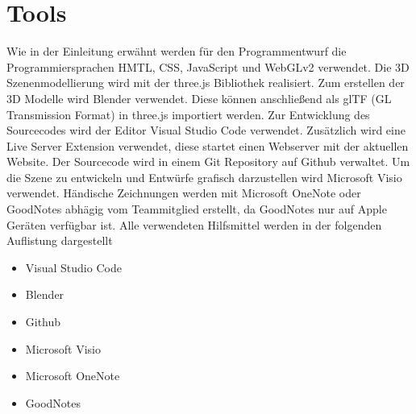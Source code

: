 \section{Tools}
Wie in der Einleitung erwähnt werden für den Programmentwurf die
Programmiersprachen HMTL, CSS, JavaScript und WebGLv2 verwendet.
Die 3D Szenenmodellierung wird mit der three.js Bibliothek realisiert.
Zum erstellen der 3D Modelle wird Blender verwendet. Diese können anschließend als
glTF (GL Transmission Format) in three.js importiert werden.
\newparagraph
Zur Entwicklung des Sourcecodes wird der Editor Visual Studio Code verwendet.
Zusätzlich wird eine Live Server Extension verwendet, diese startet einen Webserver mit der aktuellen Website.
Der Sourcecode wird in einem Git Repository auf Github verwaltet.
\newparagraph
Um die Szene zu entwickeln und Entwürfe grafisch darzustellen wird Microsoft Visio verwendet.
Händische Zeichnungen werden mit Microsoft OneNote oder GoodNotes abhägig vom Teammitglied erstellt,
da GoodNotes nur auf Apple Geräten verfügbar ist.
\newparagraph
Alle verwendeten Hilfsmittel werden in der folgenden Auflistung dargestellt
\begin{itemize}
\item Visual Studio Code
\item Blender
\item Github
\item Microsoft Visio
\item Microsoft OneNote
\item GoodNotes
\end{itemize}
